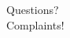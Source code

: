\documentclass[%
        hyperref={%
                pdfauthor={Zakariyya Mughal},%
                pdfpagemode={None},pdfpagelayout={SinglePage}}%
        xcolor={x11names},%
]{beamer}
\begin{document}
\begin{frame}
\frametitle{\textinterrobang}
\begin{center}
\Huge
Questions?\\Complaints!
\end{center}
\end{frame}
\end{document}
